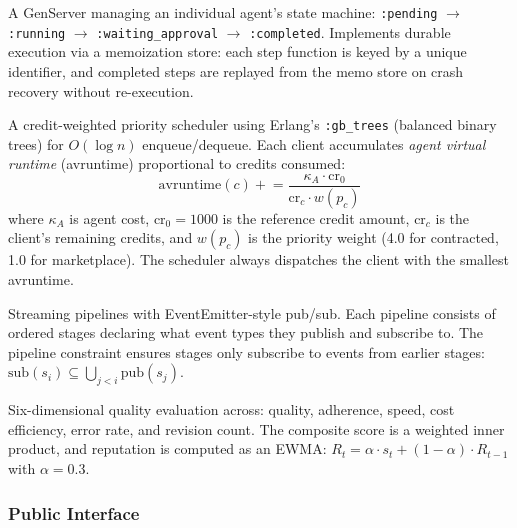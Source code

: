 \documentclass[12pt,a4paper]{article}
\theoremstyle{definition}
\begin{document}
\begin{description}[style=nextline]
  \item[\texttt{AgentScheduler.Agent}]
    A GenServer managing an individual agent's state machine:
    \texttt{:pending} $\to$ \texttt{:running} $\to$ \texttt{:waiting\_approval}
    $\to$ \texttt{:completed}.
    Implements durable execution via a memoization store: each step function is
    keyed by a unique identifier, and completed steps are replayed from the memo
    store on crash recovery without re-execution.

  \item[\texttt{AgentScheduler.Scheduler}]
    A credit-weighted priority scheduler using Erlang's \texttt{:gb\_trees}
    (balanced binary trees) for $O(\log n)$ enqueue/dequeue.
    Each client accumulates \emph{agent virtual runtime} (avruntime)
    proportional to credits consumed:
    \begin{equation}\label{eq:avruntime}
      \text{avruntime}(c) \mathrel{+}= \frac{\kappa_A \cdot \text{cr}_0}
                                              {\text{cr}_c \cdot w(p_c)}
    \end{equation}
    where $\kappa_A$ is agent cost, $\text{cr}_0 = 1000$ is the reference credit
    amount, $\text{cr}_c$ is the client's remaining credits, and $w(p_c)$ is the
    priority weight (4.0 for contracted, 1.0 for marketplace).
    The scheduler always dispatches the client with the smallest avruntime.

  \item[\texttt{AgentScheduler.Pipeline}]
    Streaming pipelines with EventEmitter-style pub/sub. Each pipeline consists of
    ordered stages declaring what event types they publish and subscribe to. The
    pipeline constraint ensures stages only subscribe to events from earlier stages:
    $\text{sub}(s_i) \subseteq \bigcup_{j < i} \text{pub}(s_j)$.

  \item[\texttt{AgentScheduler.Evaluator}]
    Six-dimensional quality evaluation across: quality, adherence, speed, cost
    efficiency, error rate, and revision count. The composite score is a weighted
    inner product, and reputation is computed as an EWMA:
    $R_t = \alpha \cdot s_t + (1 - \alpha) \cdot R_{t-1}$ with $\alpha = 0.3$.
\end{description}

\subsubsection{Public Interface}
\end{document}
